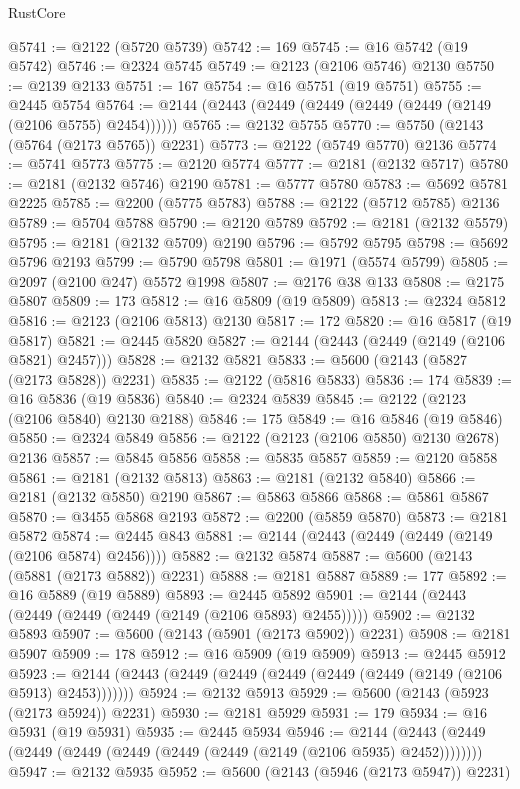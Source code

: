 \begin{lexlean}{RustCore}
\begin{coremodule}
@5741 := @2122 (@5720 @5739)
@5742 := 169
@5745 := @16 @5742 (@19 @5742)
@5746 := @2324 @5745
@5749 := @2123 (@2106 @5746) @2130
@5750 := @2139 @2133
@5751 := 167
@5754 := @16 @5751 (@19 @5751)
@5755 := @2445 @5754
@5764 := @2144 (@2443 (@2449 (@2449 (@2449 (@2449 (@2149 (@2106 @5755) @2454))))))
@5765 := @2132 @5755
@5770 := @5750 (@2143 (@5764 (@2173 @5765)) @2231)
@5773 := @2122 (@5749 @5770) @2136
@5774 := @5741 @5773
@5775 := @2120 @5774
@5777 := @2181 (@2132 @5717)
@5780 := @2181 (@2132 @5746) @2190
@5781 := @5777 @5780
@5783 := @5692 @5781 @2225
@5785 := @2200 (@5775 @5783)
@5788 := @2122 (@5712 @5785) @2136
@5789 := @5704 @5788
@5790 := @2120 @5789
@5792 := @2181 (@2132 @5579)
@5795 := @2181 (@2132 @5709) @2190
@5796 := @5792 @5795
@5798 := @5692 @5796 @2193
@5799 := @5790 @5798
@5801 := @1971 (@5574 @5799)
@5805 := @2097 (@2100 @247) @5572 @1998
@5807 := @2176 @38 @133
@5808 := @2175 @5807
@5809 := 173
@5812 := @16 @5809 (@19 @5809)
@5813 := @2324 @5812
@5816 := @2123 (@2106 @5813) @2130
@5817 := 172
@5820 := @16 @5817 (@19 @5817)
@5821 := @2445 @5820
@5827 := @2144 (@2443 (@2449 (@2149 (@2106 @5821) @2457)))
@5828 := @2132 @5821
@5833 := @5600 (@2143 (@5827 (@2173 @5828)) @2231)
@5835 := @2122 (@5816 @5833)
@5836 := 174
@5839 := @16 @5836 (@19 @5836)
@5840 := @2324 @5839
@5845 := @2122 (@2123 (@2106 @5840) @2130 @2188)
@5846 := 175
@5849 := @16 @5846 (@19 @5846)
@5850 := @2324 @5849
@5856 := @2122 (@2123 (@2106 @5850) @2130 @2678) @2136
@5857 := @5845 @5856
@5858 := @5835 @5857
@5859 := @2120 @5858
@5861 := @2181 (@2132 @5813)
@5863 := @2181 (@2132 @5840)
@5866 := @2181 (@2132 @5850) @2190
@5867 := @5863 @5866
@5868 := @5861 @5867
@5870 := @3455 @5868 @2193
@5872 := @2200 (@5859 @5870)
@5873 := @2181 @5872
@5874 := @2445 @843
@5881 := @2144 (@2443 (@2449 (@2449 (@2149 (@2106 @5874) @2456))))
@5882 := @2132 @5874
@5887 := @5600 (@2143 (@5881 (@2173 @5882)) @2231)
@5888 := @2181 @5887
@5889 := 177
@5892 := @16 @5889 (@19 @5889)
@5893 := @2445 @5892
@5901 := @2144 (@2443 (@2449 (@2449 (@2449 (@2149 (@2106 @5893) @2455)))))
@5902 := @2132 @5893
@5907 := @5600 (@2143 (@5901 (@2173 @5902)) @2231)
@5908 := @2181 @5907
@5909 := 178
@5912 := @16 @5909 (@19 @5909)
@5913 := @2445 @5912
@5923 := @2144 (@2443 (@2449 (@2449 (@2449 (@2449 (@2449 (@2149 (@2106 @5913) @2453)))))))
@5924 := @2132 @5913
@5929 := @5600 (@2143 (@5923 (@2173 @5924)) @2231)
@5930 := @2181 @5929
@5931 := 179
@5934 := @16 @5931 (@19 @5931)
@5935 := @2445 @5934
@5946 := @2144 (@2443 (@2449 (@2449 (@2449 (@2449 (@2449 (@2449 (@2149 (@2106 @5935) @2452))))))))
@5947 := @2132 @5935
@5952 := @5600 (@2143 (@5946 (@2173 @5947)) @2231)

\end{coremodule}
\end{lexlean}
